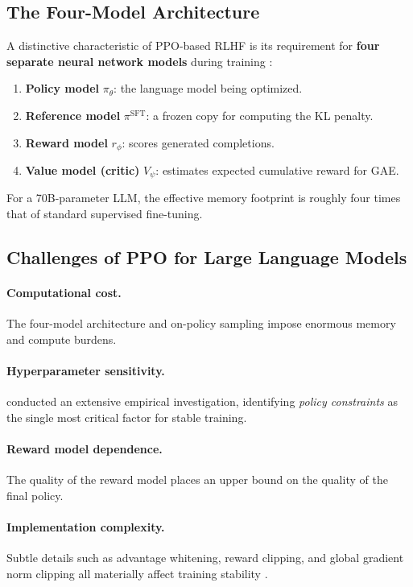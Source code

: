 \documentclass[12pt,a4paper]{report}
\begin{document}
\subsection{The Four-Model Architecture}

A distinctive characteristic of PPO-based RLHF is its requirement for \textbf{four separate neural network models} during training \cite{ouyang2022instructgpt, zheng2023secrets}:
\begin{enumerate}
    \item \textbf{Policy model} $\pi_\theta$: the language model being optimized.
    \item \textbf{Reference model} $\pi^{\text{SFT}}$: a frozen copy for computing the KL penalty.
    \item \textbf{Reward model} $r_\phi$: scores generated completions.
    \item \textbf{Value model (critic)} $V_\psi$: estimates expected cumulative reward for GAE.
\end{enumerate}
For a 70B-parameter LLM, the effective memory footprint is roughly four times that of standard supervised fine-tuning.

\subsection{Challenges of PPO for Large Language Models}

\paragraph{Computational cost.} The four-model architecture and on-policy sampling impose enormous memory and compute burdens.

\paragraph{Hyperparameter sensitivity.} \cite{zheng2023secrets} conducted an extensive empirical investigation, identifying \emph{policy constraints} as the single most critical factor for stable training.

\paragraph{Reward model dependence.} The quality of the reward model places an upper bound on the quality of the final policy.

\paragraph{Implementation complexity.} Subtle details such as advantage whitening, reward clipping, and global gradient norm clipping all materially affect training stability \cite{zheng2023secrets}.
\end{document}
